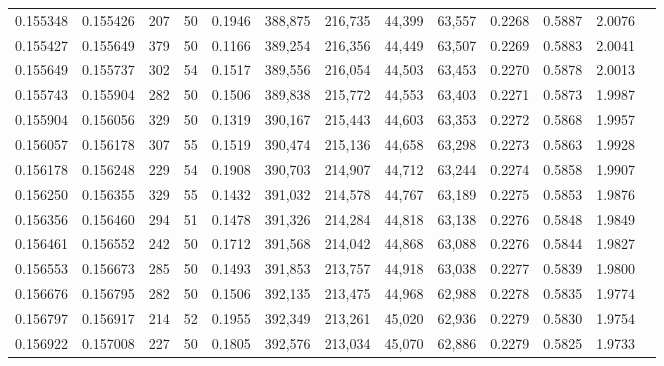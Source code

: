 \begin{tabular}{rrrrrrrrrrrrr}
0.155348 & 0.155426 &   207 &  50 &                                     0.1946 & 388,875 & 216,735 &  44,399 &  63,557 & 0.2268 & 0.5887 & 2.0076 \\
0.155427 & 0.155649 &   379 &  50 &                                     0.1166 & 389,254 & 216,356 &  44,449 &  63,507 & 0.2269 & 0.5883 & 2.0041 \\
0.155649 & 0.155737 &   302 &  54 &                                     0.1517 & 389,556 & 216,054 &  44,503 &  63,453 & 0.2270 & 0.5878 & 2.0013 \\
0.155743 & 0.155904 &   282 &  50 &                                     0.1506 & 389,838 & 215,772 &  44,553 &  63,403 & 0.2271 & 0.5873 & 1.9987 \\
0.155904 & 0.156056 &   329 &  50 &                                     0.1319 & 390,167 & 215,443 &  44,603 &  63,353 & 0.2272 & 0.5868 & 1.9957 \\
0.156057 & 0.156178 &   307 &  55 &                                     0.1519 & 390,474 & 215,136 &  44,658 &  63,298 & 0.2273 & 0.5863 & 1.9928 \\
0.156178 & 0.156248 &   229 &  54 &                                     0.1908 & 390,703 & 214,907 &  44,712 &  63,244 & 0.2274 & 0.5858 & 1.9907 \\
0.156250 & 0.156355 &   329 &  55 &                                     0.1432 & 391,032 & 214,578 &  44,767 &  63,189 & 0.2275 & 0.5853 & 1.9876 \\
0.156356 & 0.156460 &   294 &  51 &                                     0.1478 & 391,326 & 214,284 &  44,818 &  63,138 & 0.2276 & 0.5848 & 1.9849 \\
0.156461 & 0.156552 &   242 &  50 &                                     0.1712 & 391,568 & 214,042 &  44,868 &  63,088 & 0.2276 & 0.5844 & 1.9827 \\
0.156553 & 0.156673 &   285 &  50 &                                     0.1493 & 391,853 & 213,757 &  44,918 &  63,038 & 0.2277 & 0.5839 & 1.9800 \\
0.156676 & 0.156795 &   282 &  50 &                                     0.1506 & 392,135 & 213,475 &  44,968 &  62,988 & 0.2278 & 0.5835 & 1.9774 \\
0.156797 & 0.156917 &   214 &  52 &                                     0.1955 & 392,349 & 213,261 &  45,020 &  62,936 & 0.2279 & 0.5830 & 1.9754 \\
0.156922 & 0.157008 &   227 &  50 &                                     0.1805 & 392,576 & 213,034 &  45,070 &  62,886 & 0.2279 & 0.5825 & 1.9733 \\

\end{tabular}
